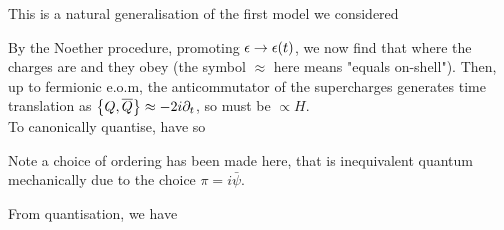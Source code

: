 \documentclass{article}
\begin{document}
\begin{remark}
This is a natural generalisation of the first model we considered 
\end{remark}
By the Noether procedure, promoting $\eps \to \eps(t)$, we now find that 
where the charges are 
and they obey
(the symbol $\approx$ here means "equals on-shell"). Then, up to fermionic e.o.m, the anticommutator of the supercharges generates time translation as $\acomm[Q]{\bar{Q}} \approx -2i \del_t$, so must be $\propto H$. \\
To canonically quantise, have 
so 
\begin{remark}
	Note a choice of ordering has been made here, that is inequivalent quantum mechanically due to the choice $\pi = i\bar{\psi}$. 
\end{remark}
From quantisation, we have 
\end{document}
